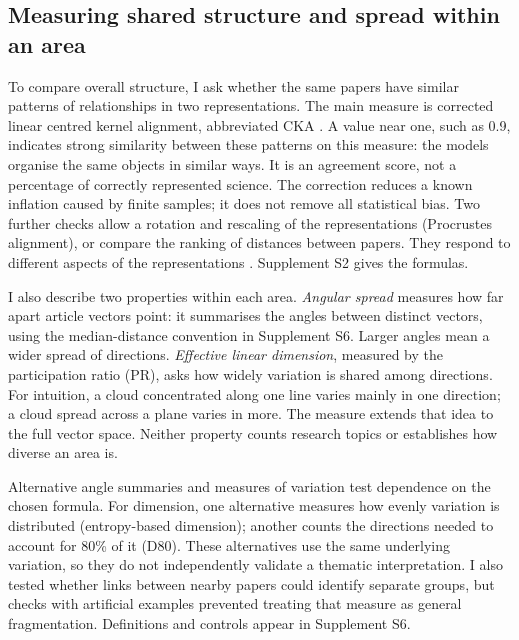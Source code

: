 \documentclass[12pt]{article}
\begin{document}
\subsection{Measuring shared structure and spread within an area}
To compare overall structure, I ask whether the same papers have similar patterns of relationships in two representations. The main measure is corrected linear centred kernel alignment, abbreviated CKA \citep{pmlr-v97-kornblith19a,refa961d84a4e}. A value near one, such as 0.9, indicates strong similarity between these patterns on this measure: the models organise the same objects in similar ways. It is an agreement score, not a percentage of correctly represented science. The correction reduces a known inflation caused by finite samples; it does not remove all statistical bias. Two further checks allow a rotation and rescaling of the representations (Procrustes alignment), or compare the ranking of distances between papers. They respond to different aspects of the representations \citep{NEURIPS2021_252a3dba,pmlr-v285-williams24a}. Supplement S2 gives the formulas.

I also describe two properties within each area. \emph{Angular spread} measures how far apart article vectors point: it summarises the angles between distinct vectors, using the median-distance convention in Supplement S6. Larger angles mean a wider spread of directions. \emph{Effective linear dimension}, measured by the participation ratio (PR), asks how widely variation is shared among directions. For intuition, a cloud concentrated along one line varies mainly in one direction; a cloud spread across a plane varies in more. The measure extends that idea to the full vector space. Neither property counts research topics or establishes how diverse an area is.

Alternative angle summaries and measures of variation test dependence on the chosen formula. For dimension, one alternative measures how evenly variation is distributed (entropy-based dimension); another counts the directions needed to account for 80\% of it (D80). These alternatives use the same underlying variation, so they do not independently validate a thematic interpretation. I also tested whether links between nearby papers could identify separate groups, but checks with artificial examples prevented treating that measure as general fragmentation. Definitions and controls appear in Supplement S6.
\end{document}
